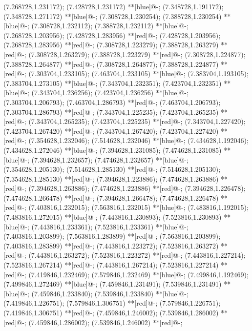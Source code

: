 (7.268728,1.231172); (7.428728,1.231172) **[blue]@{-};
(7.348728,1.191172); (7.348728,1.271172) **[blue]@{-};
(7.308728,1.230254); (7.388728,1.230254) **[blue]@{-};
(7.308728,1.232112); (7.388728,1.232112) **[blue]@{-};
(7.268728,1.203956); (7.428728,1.283956) **[red]@{-};
(7.428728,1.203956); (7.268728,1.283956) **[red]@{-};
(7.308728,1.223279); (7.388728,1.263279) **[red]@{-};
(7.308728,1.263279); (7.388728,1.223279) **[red]@{-};
(7.308728,1.224877); (7.388728,1.264877) **[red]@{-};
(7.308728,1.264877); (7.388728,1.224877) **[red]@{-};
(7.303704,1.233105); (7.463704,1.233105) **[blue]@{-};
(7.383704,1.193105); (7.383704,1.273105) **[blue]@{-};
(7.343704,1.232351); (7.423704,1.232351) **[blue]@{-};
(7.343704,1.236256); (7.423704,1.236256) **[blue]@{-};
(7.303704,1.206793); (7.463704,1.286793) **[red]@{-};
(7.463704,1.206793); (7.303704,1.286793) **[red]@{-};
(7.343704,1.225235); (7.423704,1.265235) **[red]@{-};
(7.343704,1.265235); (7.423704,1.225235) **[red]@{-};
(7.343704,1.227420); (7.423704,1.267420) **[red]@{-};
(7.343704,1.267420); (7.423704,1.227420) **[red]@{-};
(7.354628,1.232046); (7.514628,1.232046) **[blue]@{-};
(7.434628,1.192046); (7.434628,1.272046) **[blue]@{-};
(7.394628,1.231085); (7.474628,1.231085) **[blue]@{-};
(7.394628,1.232657); (7.474628,1.232657) **[blue]@{-};
(7.354628,1.205130); (7.514628,1.285130) **[red]@{-};
(7.514628,1.205130); (7.354628,1.285130) **[red]@{-};
(7.394628,1.223886); (7.474628,1.263886) **[red]@{-};
(7.394628,1.263886); (7.474628,1.223886) **[red]@{-};
(7.394628,1.226478); (7.474628,1.266478) **[red]@{-};
(7.394628,1.266478); (7.474628,1.226478) **[red]@{-};
(7.403816,1.232015); (7.563816,1.232015) **[blue]@{-};
(7.483816,1.192015); (7.483816,1.272015) **[blue]@{-};
(7.443816,1.230893); (7.523816,1.230893) **[blue]@{-};
(7.443816,1.233361); (7.523816,1.233361) **[blue]@{-};
(7.403816,1.203899); (7.563816,1.283899) **[red]@{-};
(7.563816,1.203899); (7.403816,1.283899) **[red]@{-};
(7.443816,1.223272); (7.523816,1.263272) **[red]@{-};
(7.443816,1.263272); (7.523816,1.223272) **[red]@{-};
(7.443816,1.227214); (7.523816,1.267214) **[red]@{-};
(7.443816,1.267214); (7.523816,1.227214) **[red]@{-};
(7.419846,1.232469); (7.579846,1.232469) **[blue]@{-};
(7.499846,1.192469); (7.499846,1.272469) **[blue]@{-};
(7.459846,1.231491); (7.539846,1.231491) **[blue]@{-};
(7.459846,1.233840); (7.539846,1.233840) **[blue]@{-};
(7.419846,1.226751); (7.579846,1.306751) **[red]@{-};
(7.579846,1.226751); (7.419846,1.306751) **[red]@{-};
(7.459846,1.246002); (7.539846,1.286002) **[red]@{-};
(7.459846,1.286002); (7.539846,1.246002) **[red]@{-};
